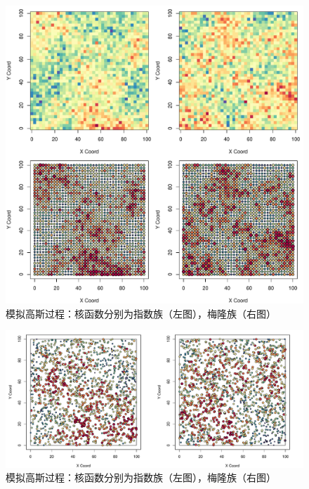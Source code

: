 \documentclass[hyperref, a4paper, UTF8, zihao = -4, linespread = 1.25, scheme = chinese]{ctexbook}
\begin{document}
\begin{figure}

{\centering \includegraphics[width=0.7\linewidth]{figures/reg-gp} 

}

\caption{模拟高斯过程：核函数分别为指数族（左图），梅隆族（右图）}\label{fig:reg-gp}
\end{figure}
\begin{figure}

{\centering \includegraphics[width=0.9\linewidth]{figures/irreg-gp} 

}

\caption{模拟高斯过程：核函数分别为指数族（左图），梅隆族（右图）}\label{fig:irreg-gp}
\end{figure}
\end{document}
